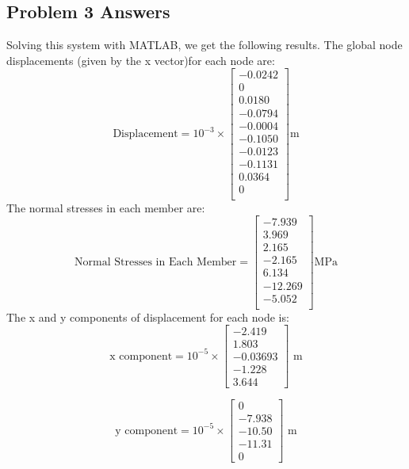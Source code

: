 \documentclass[8pt]{article}
\begin{document}
\subsection{Problem 3 Answers}
Solving this system with MATLAB, we get the following results. The global node displacements (given by the x vector)for each node are:
\[
    \text{Displacement} = 10^{-3} \times 
    \begin{bmatrix}
        -0.0242 \\
        0 \\
        0.0180 \\
        -0.0794 \\
        -0.0004 \\
        -0.1050 \\
        -0.0123 \\
        -0.1131 \\
        0.0364 \\
        0 \\
    \end{bmatrix}
    \text{m}
\]
The normal stresses in each member are:
\[
    \text{Normal Stresses in Each Member} =
    \begin{bmatrix}
        -7.939 \\
        3.969 \\
        2.165 \\
        -2.165 \\
        6.134 \\
        -12.269 \\
        -5.052 \\
    \end{bmatrix}
    \text{MPa}
\]
The x and y components of displacement for each node is:
\[
\text{x component} = 10^{-5} \times
\begin{bmatrix}
    -2.419 \\
    1.803 \\
    -0.03693 \\
    -1.228 \\
    3.644
\end{bmatrix} \text{ m}
\]

\[
\text{y component} = 10^{-5} \times
\begin{bmatrix}
    0 \\
    -7.938 \\
    -10.50 \\
    -11.31 \\
    0
\end{bmatrix} \text{ m}
\]
\end{document}
